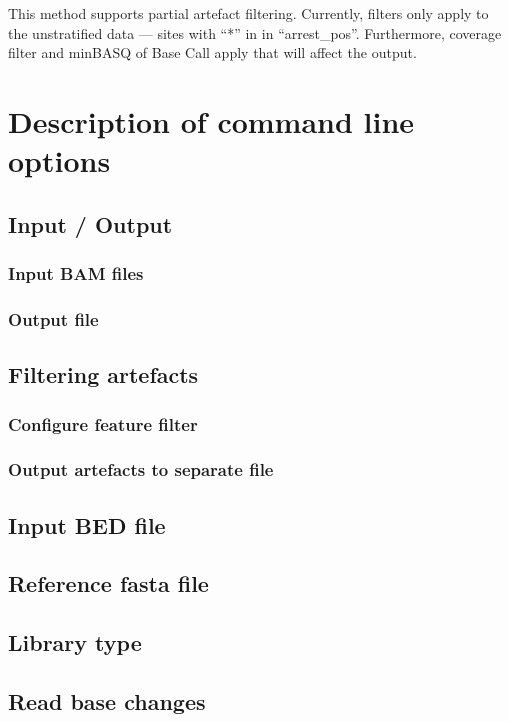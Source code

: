 \documentclass[10pt,a4paper,draft]{article}
\begin{document}
This method supports partial artefact filtering. Currently, filters only apply to the unstratified data --- 
sites with ``*'' in in ``arrest\_pos''. Furthermore, coverage filter and minBASQ of Base Call apply 
that will affect the output.
\section{Description of command line options}
\subsection{Input / Output}
\subsubsection{Input BAM files}
\subsubsection{Output file}

%
\subsection{Filtering artefacts}
\subsubsection{Configure feature filter}

\subsubsection{Output artefacts to separate file}

%
\subsection{Input BED file}

\subsection{Reference fasta file}

%
\subsection{Library type}

%
\subsection{Read base changes}

\end{document}

